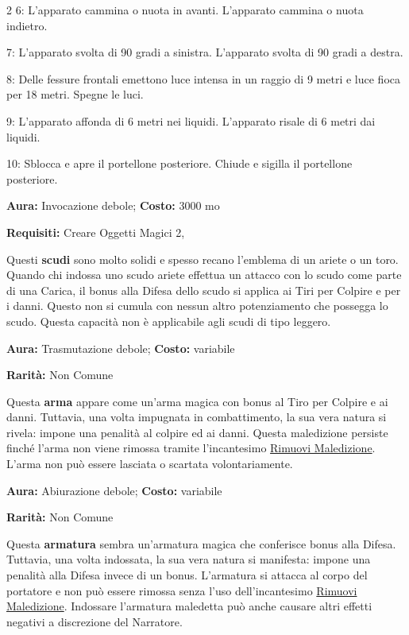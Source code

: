 \begin{multicols}{2}
6: L'apparato cammina o nuota in avanti. L'apparato cammina o nuota indietro.

7: L'apparato svolta di 90 gradi a sinistra. L'apparato svolta di 90 gradi a destra.

8: Delle fessure frontali emettono luce intensa in un raggio di 9 metri e luce fioca per 18 metri. Spegne le luci.

9: L'apparato affonda di 6 metri nei liquidi. L'apparato risale di 6 metri dai liquidi.

10: Sblocca e apre il portellone posteriore. Chiude e sigilla il portellone posteriore.


\textbf{Aura:} Invocazione debole; \textbf{Costo:} 3000 mo

\textbf{Requisiti:} Creare Oggetti Magici 2,

Questi \textbf{scudi} sono molto solidi e spesso recano l'emblema di un ariete o un toro. Quando chi indossa uno scudo ariete effettua un attacco con lo scudo come parte di una Carica, il bonus alla Difesa dello scudo si applica ai Tiri per Colpire e per i danni. Questo non si cumula con nessun altro potenziamento che possegga lo scudo. Questa capacità non è applicabile agli scudi di tipo leggero.



\textbf{Aura:} Trasmutazione debole; \textbf{Costo:} variabile

\textbf{Rarità:} Non Comune

Questa \textbf{arma} appare come un'arma magica con bonus al Tiro per Colpire e ai danni. Tuttavia, una volta impugnata in combattimento, la sua vera natura si rivela: impone una penalità al colpire ed ai danni. Questa maledizione persiste finché l'arma non viene rimossa tramite l'incantesimo \hyperlink{Rimuovi Maledizione}{Rimuovi Maledizione}. L'arma non può essere lasciata o scartata volontariamente.


\textbf{Aura:} Abiurazione debole; \textbf{Costo:} variabile

\textbf{Rarità:} Non Comune

Questa \textbf{armatura} sembra un'armatura magica che conferisce bonus alla Difesa. Tuttavia, una volta indossata, la sua vera natura si manifesta: impone una penalità alla Difesa invece di un bonus. L'armatura si attacca al corpo del portatore e non può essere rimossa senza l'uso dell'incantesimo \hyperlink{Rimuovi Maledizione}{Rimuovi Maledizione}. Indossare l'armatura maledetta può anche causare altri effetti negativi a discrezione del Narratore.



\end{multicols}
